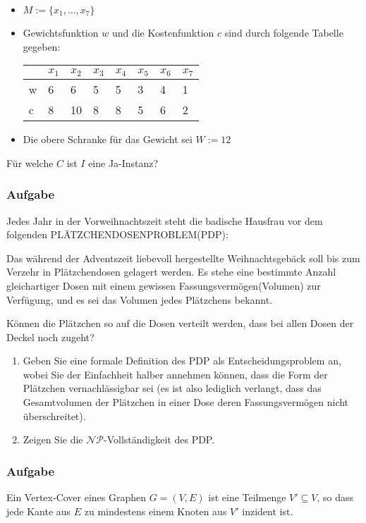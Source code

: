 \documentclass{beamer}
\begin{document}
{\begin{frame}
\begin{itemize}
\item $M := \{x_1, \ldots, x_7\}$
\item Gewichtsfunktion $w$ und die Kostenfunktion $c$ sind durch folgende Tabelle gegeben:

\begin{center}
\begin{tabular}{l|l|l|l|l|l|l|l}
	  &$x_1$ &$x_2$ &$x_3$ 	&$x_4$ 	&$x_5$ 	&$x_6$ 	&$x_7$\\ 	
  \hline
	w &6	 &6	&5	&5	&3	&4	&1\\
  \hline
	c &8	 &10	&8	&8	&5	&6	&2\\
\end{tabular}
\end{center}
\item Die obere Schranke für das Gewicht sei $W:=12$
\end{itemize}

Für welche $C$ ist $I$ eine Ja-Instanz?  
\end{frame}

\begin{frame}
\frametitle{Aufgabe}
Jedes Jahr in der Vorweihnachtszeit steht die badische Hausfrau vor dem folgenden PLÄTZCHENDOSENPROBLEM(PDP):

\hspace{1cm}\parbox{0.8\textwidth}{Das während der Adventszeit liebevoll hergestellte Weihnachtsgebäck soll bis zum Verzehr in Plätzchendosen gelagert werden.
Es stehe eine bestimmte Anzahl gleichartiger Dosen mit einem gewissen Fassungsvermögen(Volumen) zur Verfügung, und es sei das Volumen jedes Plätzchens bekannt.

Können die Plätzchen so auf die Dosen verteilt werden, dass bei allen Dosen der Deckel noch zugeht?}
\begin{enumerate}
 \item Geben Sie eine formale Definition des PDP als Entscheidungsproblem an, wobei Sie der Einfachheit halber annehmen können, dass die Form der Plätzchen vernachlässigbar sei (es ist also lediglich verlangt, dass das Gesamtvolumen der Plätzchen in einer Dose deren Fassungsvermögen nicht überschreitet).
 \item Zeigen Sie die $\mathcal{NP}$-Vollständigkeit des PDP.
\end{enumerate}
\end{frame}
\begin{frame}
\frametitle{Aufgabe}
Ein Vertex-Cover eines Graphen $G=(V,E)$ ist eine Teilmenge $V'\subseteq V$, so
dass jede Kante aus $E$ zu mindestens einem Knoten aus $V'$ inzident ist.


\end{frame}}
\end{document}
